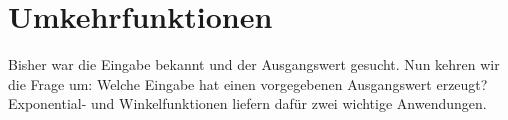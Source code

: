 \section{Umkehrfunktionen}
\label{sec:real_functions_inverse_functions}
Bisher war die Eingabe bekannt und der Ausgangswert gesucht.
Nun kehren wir die Frage um: Welche Eingabe hat einen vorgegebenen
Ausgangswert erzeugt? Exponential- und Winkelfunktionen liefern dafür
zwei wichtige Anwendungen.



